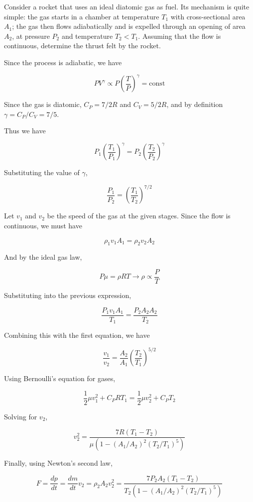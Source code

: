 \documentclass[11pt]{article}
\begin{document}
\begin{pproblem}
    Consider a rocket that uses an ideal diatomic gas as fuel. Its mechanism is quite simple: the gas starts in a chamber at temperature \(T_1\) with cross-sectional area \(A_1\); the gas then flows adiabatically and is expelled through an opening of area \(A_2\), at pressure \(P_2\) and temperature \(T_2<T_1\). Assuming that the flow is continuous, determine the thrust felt by the rocket.
\begin{pssolution*}{}{}
    Since the process is adiabatic, we have

    \[PV^\gamma \propto P\left(\frac{T}{P}\right)^\gamma = \mathrm{const}\]

    Since the gas is diatomic, \(C_P = 7/2 R\) and \(C_V = 5/2 R\), and by definition \(\gamma = C_P/C_V = 7/5\).

    Thus we have

    \[P_1\left(\frac{T_1}{P_1}\right)^\gamma = P_2\left(\frac{T_2}{P_2}\right)^\gamma\]

    Substituting the value of \(\gamma\),

    \[\frac{P_1}{P_2} = \left(\frac{T_1}{T_2}\right)^{7/2}\]

    Let \(v_1\) and \(v_2\) be the speed of the gas at the given stages. Since the flow is continuous, we must have

    \[\rho_1v_1A_1 = \rho_2v_2A_2\]

    And by the ideal gas law,

    \[P\mu = \rho R T \rightarrow \rho \propto \frac{P}{T}\]

    Substituting into the previous expression,

    \[\frac{P_1v_1A_1}{T_1}=\frac{P_2A_2A_2}{T_2}\]

    Combining this with the first equation, we have
    
    \[\frac{v_1}{v_2} = \frac{A_2}{A_1}\left(\frac{T_2}{T_1}\right)^{5/2}\]

    Using Bernoulli's equation for gases,

    \[\frac{1}{2}\mu v_1^2 + C_P RT_1 = \frac{1}{2}\mu v_2^2 + C_P T_2\]

    Solving for \(v_2\),

    \[v_2^2 = \frac{7R(T_1-T_2)}{\mu(1-(A_1/A_2)^2(T_2/T_1)^5)}\]

    Finally, using Newton's second law,

    \[F = \frac{dp}{dt} = \frac{dm}{dt}v_2 = \rho_2A_2 v_2^2 = \boxed{\frac{7P_2A_2(T_1-T_2)}{T_2(1-(A_1/A_2)^2(T_2/T_1)^5)}} \]

\end{pssolution*}

\end{pproblem}
\end{document}
